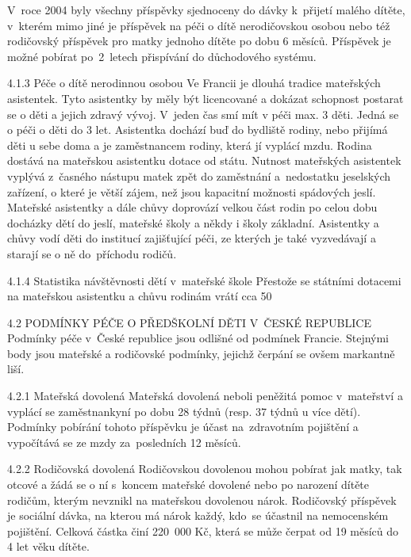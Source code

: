 V roce 2004 byly všechny příspěvky sjednoceny do dávky k přijetí malého dítěte, v kterém mimo jiné je příspěvek na péči o dítě nerodičovskou osobou nebo též rodičovský příspěvek pro matky jednoho dítěte po dobu 6 měsíců. Příspěvek je možné pobírat po 2 letech přispívání do důchodového systému.

4.1.3 Péče o dítě nerodinnou osobou
Ve Francii je dlouhá tradice mateřských asistentek. Tyto asistentky by měly být licencované a dokázat schopnost postarat se o děti a jejich zdravý vývoj. V jeden čas smí mít v péči max. 3 děti. Jedná se o péči o děti do 3 let. Asistentka dochází buď do bydliště rodiny, nebo přijímá děti u sebe doma a je zaměstnancem rodiny, která jí vyplácí mzdu. Rodina dostává na mateřskou asistentku dotace od státu.
Nutnost mateřských asistentek vyplývá z časného nástupu matek zpět do zaměstnání a nedostatku jeselských zařízení, o které je větší zájem, než jsou kapacitní možnosti spádových jeslí. Mateřské asistentky a dále chůvy doprovází velkou část rodin po celou dobu docházky dětí do jeslí, mateřské školy a někdy i školy základní. Asistentky a chůvy vodí děti do institucí zajišťující péči, ze kterých je také vyzvedávají a starají se o ně do příchodu rodičů.

4.1.4 Statistika návštěvnosti dětí v mateřské škole
Přestože se státními dotacemi na mateřskou asistentku a chůvu rodinám vrátí cca 50%

4.2 PODMÍNKY PÉČE O PŘEDŠKOLNÍ DĚTI V ČESKÉ REPUBLICE
Podmínky péče v České republice jsou odlišné od podmínek Francie. Stejnými body jsou mateřské a rodičovské podmínky, jejichž čerpání se ovšem markantně liší.

4.2.1 Mateřská dovolená
Mateřská dovolená neboli peněžitá pomoc v mateřství a vyplácí se zaměstnankyní po dobu 28 týdnů (resp. 37 týdnů u více dětí). Podmínky pobírání tohoto příspěvku je účast na zdravotním pojištění a vypočítává se ze mzdy za posledních 12 měsíců.

4.2.2 Rodičovská dovolená
Rodičovskou dovolenou mohou pobírat jak matky, tak otcové a žádá se o ní s koncem mateřské dovolené nebo po narození dítěte rodičům, kterým nevznikl na mateřskou dovolenou nárok. Rodičovský příspěvek je sociální dávka, na kterou má nárok každý, kdo se účastnil na nemocenském pojištění. Celková částka činí 220 000 Kč, která se může čerpat od 19 měsíců do 4 let věku dítěte.

